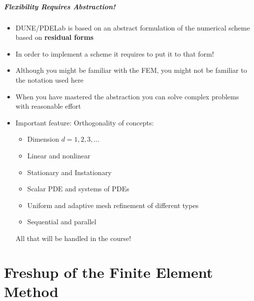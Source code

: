 \documentclass[aspectratio=169,11pt]{beamer}
\theoremstyle{definition}
\begin{document}
\begin{frame}
\frametitle{Flexibility Requires Abstraction!}
\begin{itemize}
\item DUNE/PDELab is based on an abstract formulation of the numerical scheme
based on \textbf{residual forms}
\item In order to implement a scheme it requires to put it to that form!
\item Although you might be familiar with the FEM, you might not
be familiar to the notation used here
\item When you have mastered the abstraction you can solve complex problems with
reasonable effort
\item Important feature: Orthogonality of concepts:
\begin{itemize}
\item Dimension $d=1,2,3,\ldots$
\item Linear and nonlinear
\item Stationary and Instationary
\item Scalar PDE and systems of PDEs
\item Uniform and adaptive mesh refinement of different types
\item Sequential and parallel
\end{itemize}
All that will be handled in the course!
\end{itemize}
\end{frame}

\part{Freshup of the Finite Element Method}
\begin{frame}
  \partpage
\end{frame}

\end{document}
